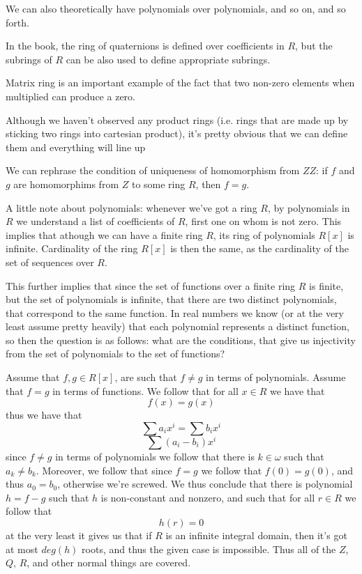 \documentclass[11pt,oneside,titlepage]{book}
\begin{document}
We can also theoretically have polynomials over polynomials, and so on,
and so forth.

In the book, the ring of quaternions is defined over coefficients in
$R$, but the subrings of $R$ can be also used to define appropriate
subrings.

Matrix ring is an important example of the fact that two non-zero
elements when multiplied can produce a zero.

Although we haven't observed any product rings (i.e. rings that are
made up by sticking two rings into cartesian product), it's pretty
obvious that we can define them and everything will line up

We can rephrase the condition of uniqueness of homomorphism from $ZZ$:
if $f$ and $g$ are homomorphims from $Z$ to some ring $R$, then $f =
g$.

A little note about polynomials: whenever we've got a ring $R$, by
polynomials in $R$ we understand a list of coefficients of $R$, first
one on whom is not zero. This implies that athough we can have a
finite ring $R$, its ring of polynomials $R[x]$ is
infinite. Cardinality of the ring $R[x]$ is then the same, as the
cardinality of the set of sequences over $R$.

This further implies that since the set of functions over a finite
ring $R$ is finite, but the set of polynomials is infinite, that there
are two distinct polynomials, that correspond to the same function. In
real numbers we know (or at the very least assume pretty heavily) that
each polynomial represents a distinct function, so then the question is
as follows: what are the conditions, that give us injectivity from the
set of polynomials to the set of functions?

Assume that $f, g \in R[x]$, are such that $f \neq g$ in terms of
polynomials. Assume that $f = g$ in terms of functions.  We follow
that for all $x \in R$ we have that
$$f(x) = g(x)$$
thus we have that
$$\sum{a_i x^i} = \sum{b_i x^i} $$
$$\sum{(a_i - b_i)x^i}$$
since $f \neq g$ in terms of polynomials we follow that there is $k
\in \omega$ such that $a_k \neq b_k$. Moreover, we follow that since
$f = g$ we follow that $f(0) = g(0)$, and thus $a_0 = b_0$, otherwise
we're screwed. We thus conclude that there is polynomial $h = f - g$
such that $h$ is non-constant and nonzero, and such that for all $r
\in R$ we follow that
$$h(r) = 0$$
at the very least it gives us that if $R$ is an infinite integral
domain, then it's got at most $deg(h)$ roots, and thus the given case
is impossible. Thus all of the $Z$, $Q$, $R$, and other normal things
are covered.
\end{document}
